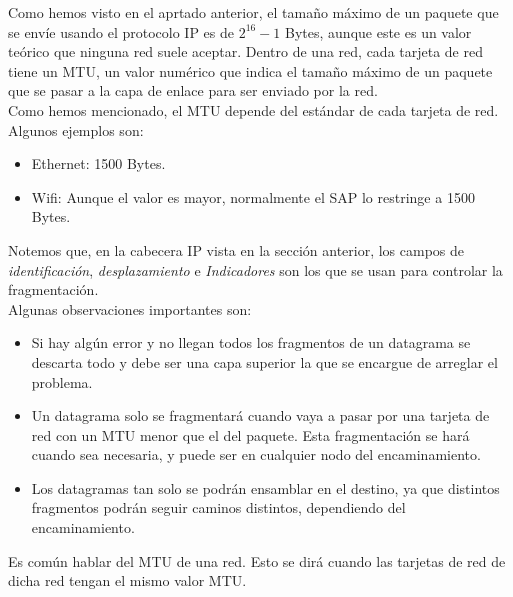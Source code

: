 Como hemos visto en el aprtado anterior, el tamaño máximo de un paquete que se envíe usando el protocolo \acrshort{IP} es de $2^{16}-1$ Bytes, aunque este es un valor teórico que ninguna red suele aceptar. 
Dentro de una red, cada tarjeta de red tiene un \acrfull{MTU}, un valor numérico que indica el tamaño máximo de un paquete que se pasar a la capa de enlace para ser enviado por la red.\\

Como hemos mencionado, el \acrshort{MTU} depende del estándar de cada tarjeta de red. Algunos ejemplos son:
\begin{itemize}
    \item Ethernet: 1500 Bytes.
    \item Wifi: Aunque el valor es mayor, normalmente el \acrshort{SAP} lo restringe a 1500 Bytes.
\end{itemize}

Notemos que, en la cabecera \acrshort{IP} vista en la sección anterior, los campos de \textit{identificación}, \textit{desplazamiento} e \textit{Indicadores} son los que se usan para controlar la fragmentación.\\

Algunas observaciones importantes son:
\begin{itemize}
    \item Si hay algún error y no llegan todos los fragmentos de un datagrama se descarta todo y debe ser una capa superior la que se encargue de arreglar el problema.
    \item Un datagrama solo se fragmentará cuando vaya a pasar por una tarjeta de red con un \acrshort{MTU} menor que el del paquete. Esta fragmentación se hará cuando sea necesaria, y puede ser en cualquier nodo del encaminamiento.
    \item Los datagramas tan solo se podrán ensamblar en el destino, ya que distintos fragmentos podrán seguir caminos distintos, dependiendo del encaminamiento.
\end{itemize}

\begin{observacion}
    Es común hablar del \acrshort{MTU} de una red. Esto se dirá cuando las tarjetas de red de dicha red tengan el mismo valor \acrshort{MTU}.
\end{observacion}

